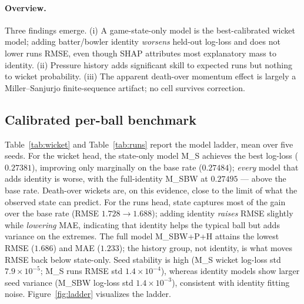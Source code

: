 \paragraph{Overview.}
Three findings emerge. (i) A game-state-only model is the best-calibrated wicket
model; adding batter/bowler identity \emph{worsens} held-out log-loss and does not
lower runs RMSE, even though SHAP attributes most explanatory mass to identity.
(ii) Pressure history adds significant skill to expected runs but nothing to
wicket probability. (iii) The apparent death-over momentum effect is largely a
Miller--Sanjurjo finite-sequence artifact; no cell survives correction.

\subsection{Calibrated per-ball benchmark}
\label{sec:results-main}
Table~\ref{tab:wicket} and Table~\ref{tab:runs} report the model ladder, mean over
five seeds. For the wicket head, the state-only model M\_S achieves the best
log-loss ($0.27381$), improving only marginally on the base rate ($0.27484$);
\emph{every} model that adds identity is worse, with the full-identity M\_SBW at
$0.27495$ --- above the base rate. Death-over wickets are, on this evidence,
close to the limit of what the observed state can predict. For the runs head, state captures most of the gain over the
base rate (RMSE $1.728 \to 1.688$); adding identity \emph{raises} RMSE slightly
while \emph{lowering} MAE, indicating that identity helps the typical ball but
adds variance on the extremes. The full model M\_SBW+P+H attains the lowest RMSE
($1.686$) and MAE ($1.233$); the history group, not identity, is what moves RMSE
back below state-only. Seed stability is high (M\_S wicket log-loss std
$7.9\times10^{-5}$; M\_S runs RMSE std $1.4\times10^{-4}$), whereas identity models
show larger seed variance (M\_SBW log-loss std $1.4\times10^{-3}$), consistent
with identity fitting noise. Figure~\ref{fig:ladder} visualizes the ladder.

